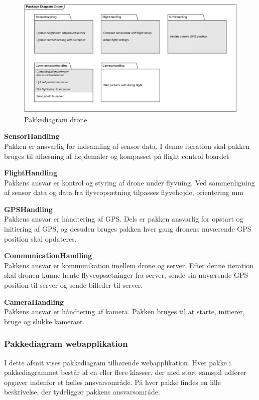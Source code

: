 \begin{figure}[H]
	\centering
	\includegraphics[width=1\textwidth]{Billeder/pakke_diagrammer/iteration3_drone.png}
	\vspace{-0.5cm}
	\caption{Pakkediagram drone}
	\label{fig:iteration2_pakke_diagram_drone}
\end{figure}

\textbf{SensorHandling}\\
Pakken er ansvarlig for indsamling af sensor data. I denne iteration skal pakken bruges til aflæsning af højdemåler og kompasset på flight control boardet. 

\textbf{FlightHandling}\\
Pakkens ansvar er kontrol og styring af drone under flyvning. Ved sammenligning af sensor data og data fra flyveopsætning tilpasses flyvehøjde, orientering mm

\textbf{GPSHandling}\\
Pakkens ansvar er håndtering af GPS. Dels er pakken ansvarlig for opstart og initiering af GPS, og desuden bruges pakken hver gang dronens nuværende GPS position skal opdateres.

\textbf{CommunicationHandling}\\
Pakkens ansvar er kommunikation imellem drone og server. Efter denne iteration skal dronen kunne hente flyveopsætninger fra server, sende sin nuværende GPS position til server og sende billeder til server.

\textbf{CameraHandling}\\
Pakkens ansvar er håndtering af kamera. Pakken bruges til at starte, initierer, bruge og slukke kameraet.


\newpage
\subsubsection*{Pakkediagram webapplikation}
I dette afsnit vises pakkediagram tilhørende webapplikation. Hver pakke i pakkediagrammet består af en eller flere klasser, der med stort samspil udfører opgaver indenfor et fælles ansvarsområde. 
På hver pakke findes en lille beskrivelse, der tydeliggør pakkens ansvarsområde.

